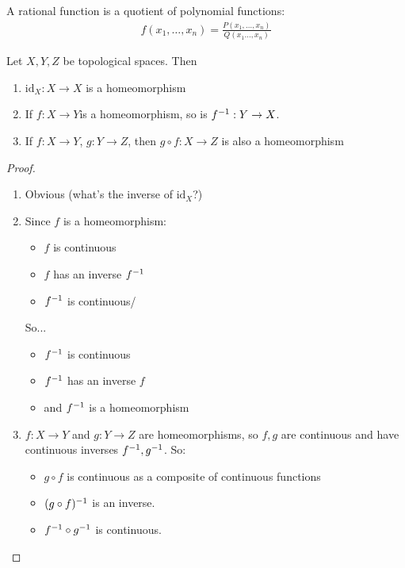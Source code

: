\documentclass[12pt, twosided]{article}
\begin{document}
\begin{note}
  A rational function is a quotient of polynomial functions:
  \begin{align*}
    f(x_1, \ldots, x_n) = \frac{P(x_1, \ldots, x_n)}{Q(x_1 \ldots, x_n)}
  \end{align*}
\end{note}

\begin{lm}
  Let \(X, Y, Z\) be topological spaces. Then
  \begin{enumerate}
  \item \(\mathrm{id}_X: X \to X\) is a homeomorphism
  \item If \(f: X \to Y\)is a homeomorphism, so is \(f^{-1}: Y \to X\).
  \item If \(f: X \to Y\), \(g: Y \to Z\), then \(g \circ f : X \to Z\) is also a homeomorphism
  \end{enumerate}
\end{lm}
\begin{proof}
  \begin{enumerate}
  \item Obvious (what's the inverse of \(\mathrm{id}_X\)?)\partdone
  \item Since \(f\) is a homeomorphism:
    \begin{itemize}
    \item \(f\) is continuous
    \item \(f\) has an inverse \(f^{-1}\)
    \item \(f^{-1}\) is continuous/
    \end{itemize}
    So...
    \begin{itemize}
    \item \(f^{-1}\) is continuous
    \item \(f^{-1}\) has an inverse \(f\)
    \item and \(f^{-1}\) is a homeomorphism
    \end{itemize}\partdone
  \item \(f: X \to Y\) and \(g: Y \to Z\) are homeomorphisms, so \(f, g\) are continuous and have continuous inverses \(f^{-1}, g^{-1}\). So:
    \begin{itemize}
    \item \(g \circ f\) is continuous as a composite of continuous functions
    \item \((g \circ f)^{-1}\) is an inverse.
    \item \(f^{-1} \circ g^{-1}\) is continuous.
    \end{itemize}
  \end{enumerate}
\end{proof}
\end{document}
